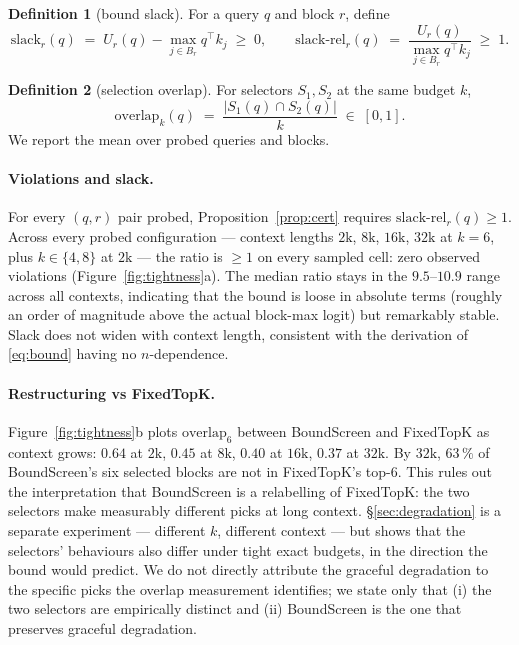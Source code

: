 \documentclass[11pt]{article}
\theoremstyle{plain}
\theoremstyle{definition}
\newtheorem{definition}{Definition}
\newcommand{\ur}{U_r}
\begin{document}
\begin{definition}[bound slack]
For a query $q$ and block $r$, define
\begin{equation}
\mathrm{slack}_r(q) \;=\; \ur(q) - \max_{j \in B_r} q^{\top} k_j \;\ge\; 0, \qquad
\mathrm{slack\text{-}rel}_r(q) \;=\; \frac{\ur(q)}{\max_{j \in B_r} q^{\top} k_j} \;\ge\; 1.
\end{equation}
\end{definition}

\begin{definition}[selection overlap]
For selectors $S_1, S_2$ at the same budget $k$,
\begin{equation}
\mathrm{overlap}_k(q) \;=\; \frac{|S_1(q) \cap S_2(q)|}{k} \;\in\; [0, 1].
\end{equation}
We report the mean over probed queries and blocks.
\end{definition}

\paragraph{Violations and slack.}
For every $(q, r)$ pair probed, Proposition~\ref{prop:cert} requires
$\mathrm{slack\text{-}rel}_r(q) \ge 1$. Across every probed configuration
--- context lengths $2\mathrm{k}$, $8\mathrm{k}$, $16\mathrm{k}$, $32\mathrm{k}$
at $k = 6$, plus $k \in \{4, 8\}$ at $2\mathrm{k}$ --- the ratio is
$\ge 1$ on every sampled cell: zero observed violations
(Figure~\ref{fig:tightness}a). The median ratio stays in the $9.5$--$10.9$
range across all contexts, indicating that the bound is loose in absolute
terms (roughly an order of magnitude above the actual block-max logit)
but remarkably stable. Slack does not widen with context length,
consistent with the derivation of \eqref{eq:bound} having no $n$-dependence.

\paragraph{Restructuring vs FixedTopK.}
Figure~\ref{fig:tightness}b plots $\mathrm{overlap}_6$ between
BoundScreen and FixedTopK as context grows: $0.64$ at $2\mathrm{k}$,
$0.45$ at $8\mathrm{k}$, $0.40$ at $16\mathrm{k}$, $0.37$ at $32\mathrm{k}$.
By $32\mathrm{k}$, $63\,\%$ of BoundScreen's six selected blocks are not
in FixedTopK's top-6. This rules out the interpretation that BoundScreen
is a relabelling of FixedTopK: the two selectors make measurably different
picks at long context. \S\ref{sec:degradation} is a separate experiment
--- different $k$, different context --- but shows that the selectors'
behaviours also differ under tight exact budgets, in the direction the
bound would predict. We do not directly attribute the graceful
degradation to the specific picks the overlap measurement identifies; we
state only that (i) the two selectors are empirically distinct and (ii)
BoundScreen is the one that preserves graceful degradation.
\end{document}
